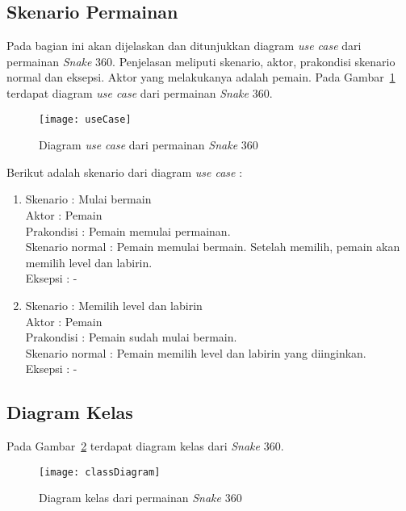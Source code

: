 \subsection{Skenario Permainan}
Pada bagian ini akan dijelaskan dan ditunjukkan diagram \textit{use case} dari permainan \textit{Snake} 360. Penjelasan meliputi skenario, aktor, prakondisi skenario normal dan eksepsi. Aktor yang melakukanya adalah pemain. Pada Gambar~\ref{fig:useCase} terdapat diagram \textit{use case} dari permainan \textit{Snake} 360.

\begin{figure}[H]
	\centering  
	\texttt{[image: useCase]}  
	\caption[Diagram \textit{use case} dari permainan \textit{Snake} 360]{Diagram \textit{use case} dari permainan \textit{Snake} 360}
	\label{fig:useCase} 
\end{figure}

Berikut adalah skenario dari diagram \textit{use case} :

\begin{enumerate}
	\item Skenario : Mulai bermain \\
Aktor : Pemain \\
Prakondisi : Pemain memulai permainan.\\
Skenario normal : Pemain memulai bermain. Setelah memilih, pemain akan memilih level dan labirin. \\
Eksepsi : - \\

	\item Skenario : Memilih level dan labirin \\
Aktor : Pemain \\
Prakondisi : Pemain sudah mulai bermain. \\
Skenario normal : Pemain memilih level dan labirin yang diinginkan. \\ 
Eksepsi : - \\
\end{enumerate}

\subsection{Diagram Kelas}
Pada Gambar~\ref{fig:classDiagram} terdapat diagram kelas dari \textit{Snake} 360.

\begin{figure}[H]
	\centering  
	\texttt{[image: classDiagram]}  
	\caption[Diagram class dari permainan \textit{Snake} 360]{Diagram kelas dari permainan \textit{Snake} 360}
	\label{fig:classDiagram} 
\end{figure}

